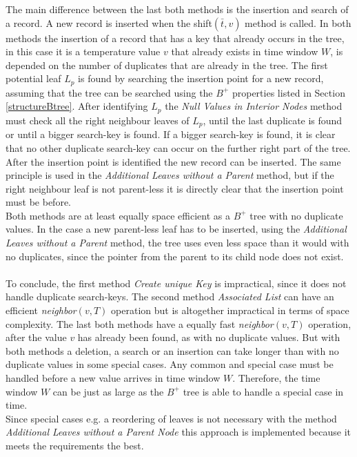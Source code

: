 \documentclass[abstracton,12pt]{scrreprt}
\begin{document}
The main difference between the last both methods is the insertion and search of a record. A new record is inserted when the shift$(\bar{t}, v)$ method is called. In both methods the insertion of a record that has a key that already occurs in the tree, in this case it is a temperature value $v$ that already exists in time window $W$, is depended on the number of duplicates that are already in the tree. The first potential leaf $L_p$ is found by searching the insertion point for a new record, assuming that the tree can be searched using the $B^+$ properties listed in Section \ref{structureBtree}. After identifying $L_p$ the \emph{Null Values in Interior Nodes} method must check all the right neighbour leaves of $L_p$, until the last duplicate is found or until a bigger search-key is found. If a bigger search-key is found, it is clear that no other duplicate search-key can occur on the further right part of the tree. After the insertion point is identified the new record can be inserted. The same principle is used in the \emph{Additional Leaves without a Parent} method, but if the right neighbour leaf is not parent-less it is directly clear that the insertion point must be before. \\Both methods are at least equally space efficient as a $B^+$ tree with no duplicate values. In the case a new parent-less leaf has to be inserted, using the \emph{Additional Leaves without a Parent} method, the tree uses even less space than it would with no duplicates, since the pointer from the parent to its child node does not exist. \\\\
To conclude, the first method \emph{Create unique Key} is impractical, since it does not handle duplicate search-keys. The second method \emph{Associated List} can have an efficient \emph{neighbor}$(v,T)$ operation but is altogether impractical in terms of space complexity. 
The last both methods have a equally fast \emph{neighbor}$(v,T)$ operation, after the value $v$ has already been found, as with no duplicate values. But with both methods a deletion, a search or an insertion can take longer than with no duplicate values in some special cases. Any common and special case must be handled before a new value arrives in time window $W$. Therefore, the time window $W$ can be just as large as the $B^+$ tree is able to handle a special case in time. \\
Since special cases e.g. a reordering of leaves is not necessary with the method \emph{Additional Leaves without a Parent Node} this approach is implemented because it meets the requirements the best. 
\end{document}
